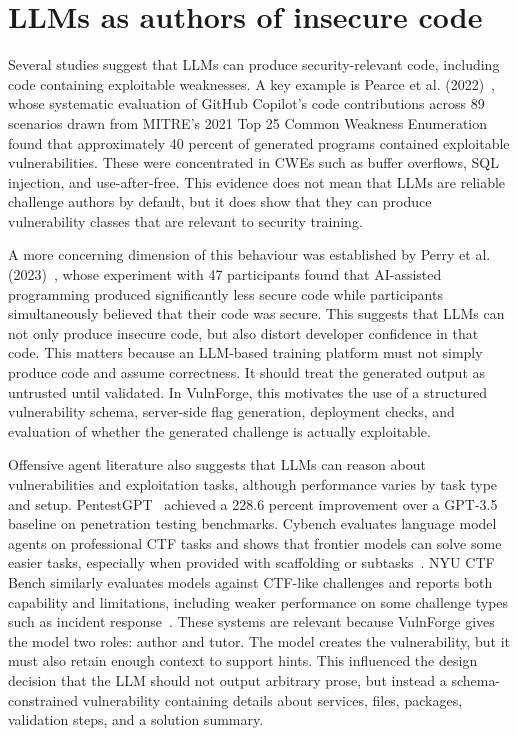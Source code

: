 \section{LLMs as authors of insecure code}\label{sec:LLMs}
Several studies suggest that LLMs can produce security-relevant code, including code containing exploitable weaknesses. A key example is Pearce et al. (2022)~\citep{pearce_asleep_2021}, whose systematic evaluation of GitHub Copilot's code contributions across 89 scenarios drawn from MITRE's 2021 Top 25 Common Weakness Enumeration found that approximately 40 percent of generated programs contained exploitable vulnerabilities. These were concentrated in CWEs such as buffer overflows, SQL injection, and use-after-free. This evidence does not mean that LLMs are reliable challenge authors by default, but it does show that they can produce vulnerability classes that are relevant to security training.

A more concerning dimension of this behaviour was established by Perry et al. (2023)~\citep{perry_users_2023}, whose experiment with 47 participants found that AI-assisted programming produced significantly less secure code while participants simultaneously believed that their code was secure. This suggests that LLMs can not only produce insecure code, but also distort developer confidence in that code. This matters because an LLM-based training platform must not simply produce code and assume correctness. It should treat the generated output as untrusted until validated. In VulnForge, this motivates the use of a structured vulnerability schema, server-side flag generation, deployment checks, and evaluation of whether the generated challenge is actually exploitable.

Offensive agent literature also suggests that LLMs can reason about vulnerabilities and exploitation tasks, although performance varies by task type and setup. PentestGPT~\citep{deng_pentestgpt_2024} achieved a 228.6 percent improvement over a GPT-3.5 baseline on penetration testing benchmarks. Cybench evaluates language model agents on professional CTF tasks and shows that frontier models can solve some easier tasks, especially when provided with scaffolding or subtasks~\citep{zhang_cybench_2025}. NYU CTF Bench similarly evaluates models against CTF-like challenges and reports both capability and limitations, including weaker performance on some challenge types such as incident response~\citep{shao_nyu_2025}. These systems are relevant because VulnForge gives the model two roles: author and tutor. The model creates the vulnerability, but it must also retain enough context to support hints. This influenced the design decision that the LLM should not output arbitrary prose, but instead a schema-constrained vulnerability containing details about services, files, packages, validation steps, and a solution summary.

